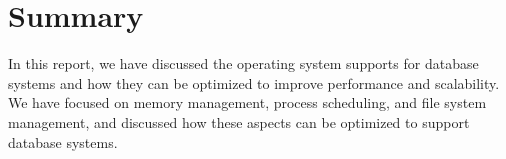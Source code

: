 \documentclass[11pt,a4paper]{article}
\begin{document}
\section{Summary}

In this report, we have discussed the operating system supports for database systems and how they can be optimized to improve performance and scalability.
We have focused on memory management, process scheduling, and file system management, and discussed how these aspects can be optimized to support database systems.



\end{document}
